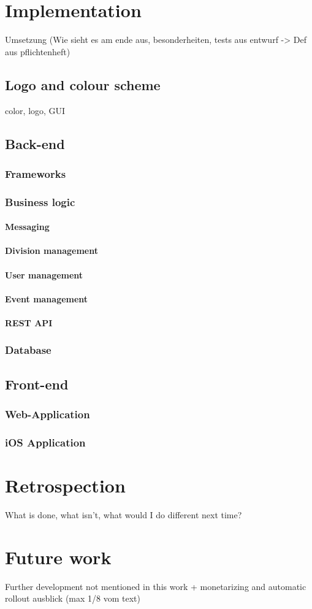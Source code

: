 \chapter{Implementation}
\label{chapter:Implementation}
Umsetzung (Wie sieht es am ende aus, besonderheiten, tests aus entwurf -> Def aus pflichtenheft)

\section{Logo and colour scheme}
\label{sec:GUI}
color, logo, GUI

\section{Back-end}
\subsection{Frameworks}
\subsection{Business logic}
\subsubsection{Messaging}
\subsubsection{Division management}
\subsubsection{User management}
\subsubsection{Event management}
\subsubsection{REST API}
\subsection{Database}

\section{Front-end}
\subsection{Web-Application}
\subsection{iOS Application}

\chapter{Retrospection}

What is done, what isn't, what would I do different next time?

\chapter{Future work}
\label{chapter:OngoingWork}
Further development not mentioned in this work + monetarizing and automatic rollout
ausblick (max 1/8 vom text)

